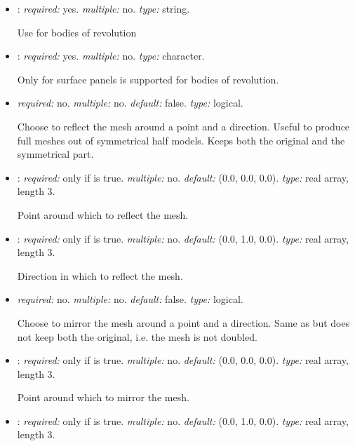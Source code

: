 \begin{itemize}

\item {}: \textit{required:} yes. \textit{multiple:} no. \textit{type:} string. 

Use  for bodies of revolution

\item {}: \textit{required:} yes. \textit{multiple:} no. \textit{type:} character.

    Only  for surface panels is supported for bodies of revolution.

\item {} \textit{required:} no. \textit{multiple:} no. \textit{default:} false. \textit{type:} logical.

Choose to reflect the mesh around a point and a direction. Useful to produce full meshes out of symmetrical half models. Keeps both the original and the symmetrical part. 

\item {}: \textit{required:} only if  is true. \textit{multiple:} no. \textit{default:} (0.0, 0.0, 0.0). \textit{type:} real array, length 3.

Point around which to reflect the mesh.

\item {}: \textit{required:} only if  is true. \textit{multiple:} no. \textit{default:} (0.0, 1.0, 0.0). \textit{type:} real array, length 3.

Direction in which to reflect the mesh.

\item {} \textit{required:} no. \textit{multiple:} no. \textit{default:} false. \textit{type:} logical.

Choose to mirror the mesh around a point and a direction. Same as  but does not keep both the original, i.e. the mesh is not doubled.

\item {}: \textit{required:} only if  is true. \textit{multiple:} no. \textit{default:} (0.0, 0.0, 0.0). \textit{type:} real array, length 3.

Point around which to mirror the mesh.

\item {}: \textit{required:} only if  is true. \textit{multiple:} no. \textit{default:} (0.0, 1.0, 0.0). \textit{type:} real array, length 3.


\end{itemize}
